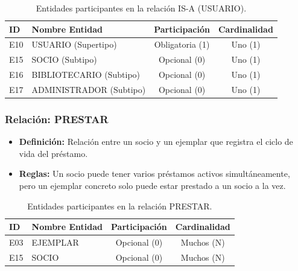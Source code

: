 	\begin{table}[H]
		\centering
		\caption{Entidades participantes en la relación IS-A (USUARIO).}
		\label{tab:rel_isa_usuario}
		\small
		\begin{tabularx}{\textwidth}{X l c c}
			\toprule
			\textbf{ID} & \textbf{Nombre Entidad} & \textbf{Participación} & \textbf{Cardinalidad} \\
			\midrule
			E10 & USUARIO (Supertipo) & Obligatoria (1) & Uno (1) \\
			\addlinespace
			E15 & SOCIO (Subtipo) & Opcional (0) & Uno (1) \\
			\addlinespace
			E16 & BIBLIOTECARIO (Subtipo) & Opcional (0) & Uno (1) \\
			\addlinespace
			E17 & ADMINISTRADOR (Subtipo) & Opcional (0) & Uno (1) \\
			\bottomrule
		\end{tabularx}
	\end{table}
	
	\subsubsection{Relación: PRESTAR}
	\begin{itemize}
		\item\textbf{Definición:} Relación entre un socio y un ejemplar que registra el ciclo de vida del préstamo.
		\item\textbf{Reglas:} Un socio puede tener varios préstamos activos simultáneamente, pero un ejemplar concreto solo puede estar prestado a un socio a la vez.
	\end{itemize}
	
	\begin{table}[H]
		\centering
		\caption{Entidades participantes en la relación PRESTAR.}
		\label{tab:rel_prestar}
		\small
		\begin{tabularx}{\textwidth}{X l c c}
			\toprule
			\textbf{ID} & \textbf{Nombre Entidad} & \textbf{Participación} & \textbf{Cardinalidad} \\
			\midrule
			E03 & EJEMPLAR & Opcional (0) & Muchos (N) \\
			\addlinespace
			E15 & SOCIO & Opcional (0) & Muchos (N) \\
			\bottomrule
		\end{tabularx}
	\end{table}
	
